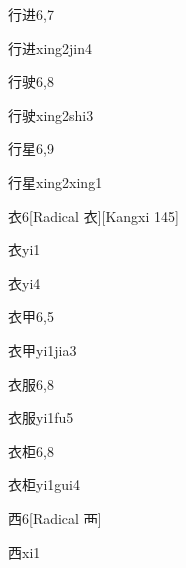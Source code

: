 \begin{entry}{行进}{6,7}
  \begin{phonetics}{行进}{xing2jin4}
  \end{phonetics}
\end{entry}

\begin{entry}{行驶}{6,8}
  \begin{phonetics}{行驶}{xing2shi3}
  \end{phonetics}
\end{entry}

\begin{entry}{行星}{6,9}
  \begin{phonetics}{行星}{xing2xing1}
  \end{phonetics}
\end{entry}

\begin{entry}{衣}{6}[Radical 衣][Kangxi 145]
  \begin{phonetics}{衣}{yi1}
  \end{phonetics}
  \begin{phonetics}{衣}{yi4}
  \end{phonetics}
\end{entry}

\begin{entry}{衣甲}{6,5}
  \begin{phonetics}{衣甲}{yi1jia3}
  \end{phonetics}
\end{entry}

\begin{entry}{衣服}{6,8}
  \begin{phonetics}{衣服}{yi1fu5}
  \end{phonetics}
\end{entry}

\begin{entry}{衣柜}{6,8}
  \begin{phonetics}{衣柜}{yi1gui4}
  \end{phonetics}
\end{entry}

\begin{entry}{西}{6}[Radical 襾]
  \begin{phonetics}{西}{xi1}
  \end{phonetics}
\end{entry}

